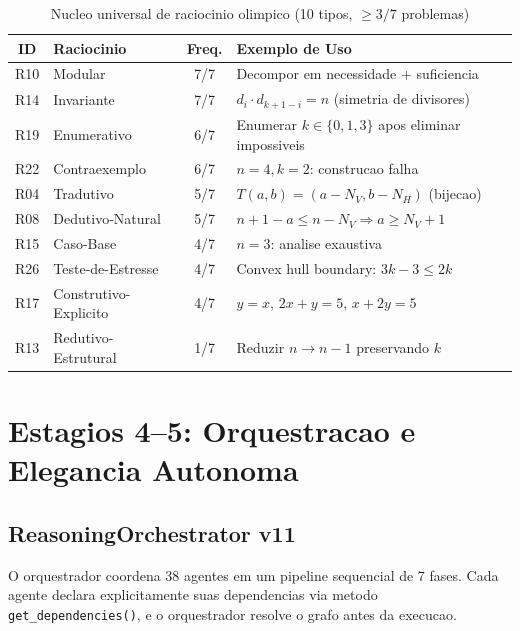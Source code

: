 \documentclass[5p]{elsarticle}
\begin{document}
\begin{table}[H]
  \centering
  \caption{Nucleo universal de raciocinio olimpico (10 tipos, $\geq 3/7$ problemas)}
  \label{tab:core}
  \small
  \begin{tabular}{clcp{3.5cm}}
    \toprule
    \textbf{ID} & \textbf{Raciocinio} & \textbf{Freq.} & \textbf{Exemplo de Uso} \\
    \midrule
    R10 & Modular & 7/7 & Decompor em necessidade + suficiencia \\
    \rowcolor{greenbg}
    R14 & Invariante & 7/7 & $d_i\cdot d_{k+1-i}=n$ (simetria de divisores) \\
    R19 & Enumerativo & 6/7 & Enumerar $k\in\{0,1,3\}$ apos eliminar impossiveis \\
    \rowcolor{greenbg}
    R22 & Contraexemplo & 6/7 & $n=4,k=2$: construcao falha \\
    R04 & Tradutivo & 5/7 & $T(a,b)=(a-N_V,b-N_H)$ (bijecao) \\
    R08 & Dedutivo-Natural & 5/7 & $n+1-a\leq n-N_V \Rightarrow a\geq N_V+1$ \\
    R15 & Caso-Base & 4/7 & $n=3$: analise exaustiva \\
    R26 & Teste-de-Estresse & 4/7 & Convex hull boundary: $3k-3\leq 2k$ \\
    R17 & Construtivo-Explicito & 4/7 & $y=x$, $2x+y=5$, $x+2y=5$ \\
    R13 & Redutivo-Estrutural & 1/7 & Reduzir $n\to n-1$ preservando $k$ \\
    \bottomrule
  \end{tabular}
\end{table}

\section{Estagios 4--5: Orquestracao e Elegancia Autonoma}

\subsection{ReasoningOrchestrator v11}

O orquestrador coordena 38 agentes em um pipeline sequencial de 7 fases. Cada
agente declara explicitamente suas dependencias via metodo \texttt{get\_dependencies()},
e o orquestrador resolve o grafo antes da execucao.
\end{document}
